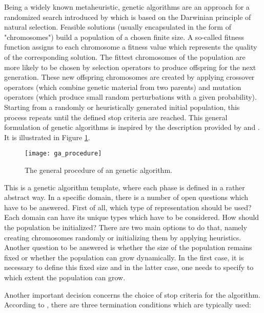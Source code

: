 Being a widely known metaheuristic, genetic algorithms are an approach for a randomized search introduced by \citeauthor{holland1975adaptation} \cite{holland1975adaptation} which is based on the Darwinian principle of natural selection.  Feasible solutions (usually encapsulated in the form of "chromosomes") build a population of a chosen finite size. A so-called fitness function assigns to each chromosome a fitness value which represents the quality of the corresponding solution. The fittest chromosomes of the population are more likely to be chosen by selection operators to produce offspring for the next generation. These new offspring chromosomes are created by applying crossover operators (which combine genetic material from two parents) and mutation operators (which produce small random perturbations with a given probability).  Starting from a randomly or heuristically generated initial population, this process repeats until the defined stop criteria are reached. This general formulation of genetic algorithms is inspired by the description provided by \citeauthor{potvin1996genetic} \cite{potvin1996genetic} and \citeauthor{gendreau2005metaheuristics} \cite{gendreau2005metaheuristics}. It is illustrated in Figure \ref{ga_procedure}.

 \begin{figure}[htp] \centering
	\centering
	\texttt{[image: ga\_procedure]}
	\caption{The general procedure of an genetic algorithm.}
	\label{ga_procedure}
\end{figure}

This is a genetic algorithm template, where each phase is defined in a rather abstract way. In a specific domain, there is a number of open questions which have to be answered. First of all, which type of representation should be used? Each domain can have its unique types which have to be considered. How should the population be initialized? There are two main options to do that, namely creating chromosomes randomly or initializing them by applying heuristics. Another question to be answered is whether the size of the population remains fixed or whether the population can grow dynamically. In the first case, it is necessary to define this fixed size and in the latter case, one needs to specify to which extent the population can grow. \par 

Another important decision concerns the choice of stop criteria for the algorithm. According to \citeauthor{safe2004stopping} \cite{safe2004stopping}, there are three termination conditions which are typically used: 

